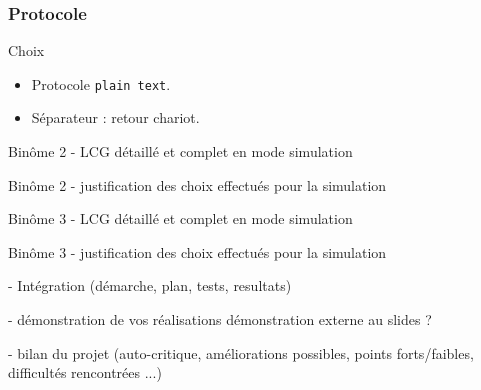 \documentclass{beamer}
\begin{document}
\begin{frame}
\frametitle{Protocole}
    \begin{block}{Choix}
	\begin{itemize}
	    \item Protocole \texttt{plain text}.
	    \item Séparateur : retour chariot.
	\end{itemize}
    \end{block}
\end{frame}

\begin{frame}
Binôme 2
- LCG détaillé et complet en mode simulation
\end{frame}

\begin{frame}
Binôme 2
- justification des choix effectués pour la simulation  
\end{frame}

\begin{frame}
Binôme 3
- LCG détaillé et complet en mode simulation
\end{frame}

\begin{frame}
Binôme 3
- justification des choix effectués pour la simulation 
\end{frame}

\begin{frame}
- Intégration (démarche, plan, tests, resultats)
\end{frame}

\begin{frame}
- démonstration de vos réalisations
démonstration externe au slides ?
\end{frame}

\begin{frame}
- bilan du projet (auto-critique, améliorations possibles, points forts/faibles, difficultés rencontrées ...) 
\end{frame}
\end{document}
